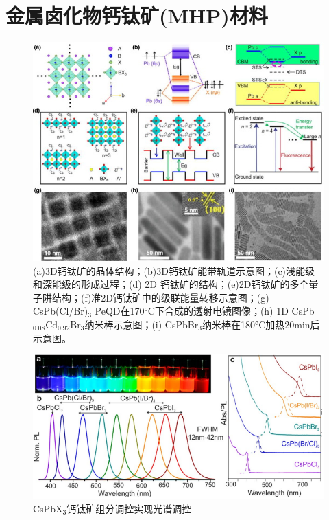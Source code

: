 \documentclass{phyasgn}\usepackage{nag}
\begin{document}
\section{金属卤化物钙钛矿(MHP)材料}
\begin{figure}[H]
	\centering
	\hspace{2em}\includegraphics[width=.8\linewidth]{pic/1.jpg}
	\caption{(a)3D钙钛矿的晶体结构；(b)3D钙钛矿能带轨道示意图；(c)浅能级和深能级的形成过程；(d) 2D 钙钛矿的结构；(e)2D钙钛矿的多个量子阱结构；(f)准2D钙钛矿中的级联能量转移示意图；(g) CsPb(Cl/Br)$_3$ PeQD在170\si{\degreeCelsius}下合成的透射电镜图像；(h) 1D CsPb$_{0.08}$Cd$_{0.92}$Br$_3$纳米棒示意图；(i) CsPbBr$_3$纳米棒在180\si{\degreeCelsius}加热20min后示意图。\cite{zhang2021blue}
	}
\end{figure}
	\begin{figure}[H]
		\centering
		\hspace{2em}\includegraphics[width=.8\linewidth]{pic/2.png}
		\caption{CsPbX$_{3}$钙钛矿组分调控实现光谱调控\cite{yakunin2015low}
		}
	\end{figure}
\end{document}

